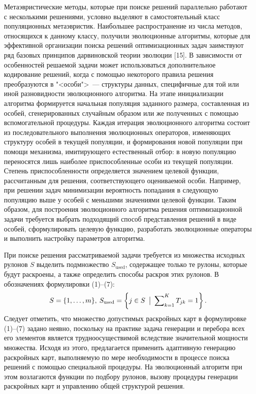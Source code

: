 \documentclass[12pt]{article}
\begin{document}
Метаэвристические методы, которые при поиске решений параллельно работают с 
несколькими решениями, условно выделяют в самостоятельный класс популяционных 
метаэвристик. Наибольшее распространение из числа методов, относящихся к 
данному классу, получили эволюционные алгоритмы, которые для эффективной 
организации поиска решений оптимизационных задач заимствуют ряд базовых 
принципов дарвиновской теории эволюции [15]. В зависимости от особенностей 
решаемой задачи может использоваться дополнительное кодирование решений, когда 
с помощью некоторого правила решения преобразуются в "<особи">~--- структуры 
данных, специфичные для той или иной разновидности эволюционного алгоритма. 
На этапе инициализации алгоритма формируется начальная популяция заданного 
размера, составленная из особей, сгенерированных случайным образом или же 
полученных с помощью вспомогательной процедуры. Каждая итерация эволюционного 
алгоритма состоит из последовательного выполнения эволюционных операторов, 
изменяющих структуру особей в текущей популяции, и формирования новой популяции 
при помощи механизма, имитирующего естественный отбор: в новую популяцию 
переносятся лишь наиболее приспособленные особи из текущей популяции. Степень 
приспособленности определяется значением целевой функции, рассчитанным для 
решения, соответствующего оцениваемой особи. Например, при решении задач 
минимизации вероятность попадания в следующую популяцию выше у особей с 
меньшими значениями целевой функции. Таким образом, для построения 
эволюционного алгоритма решения оптимизационной задачи требуется выбрать 
подходящий способ представления решений в виде особей, сформулировать целевую 
функцию, разработать эволюционные операторы и выполнить настройку параметров 
алгоритма.

При поиске решения рассматриваемой задачи требуется из множества исходных 
рулонов $S$ выделить подмножество $S_{\text{used}}$, содержащее только те 
рулоны, которые будут раскроены, а также определить способы раскроя этих 
рулонов. В обозначениях формулировки (1)--(7):
\[ S=\{1,\ldots,m\},\: 
   S_{\text{used}}=\left\{ j \in S \: \bigm| \: \sum\nolimits_{k=1}^{K} T_{jk}=1 \right\}. \]
Следует отметить, что множество допустимых раскройных карт в формулировке 
(1)--(7) задано неявно, поскольку на практике задача генерации и перебора всех 
его элементов является трудноосуществимой вследствие значительной мощности 
множества. Исходя из этого, предлагается применить адаптивную генерацию 
раскройных карт, выполняемую по мере необходимости в процессе поиска решений 
с помощью специальной процедуры. На эволюционный алгоритм при этом возлагаются 
функции по подбору рулонов, вызову процедуры генерации раскройных карт и 
управлению общей структурой решения.
\end{document}
